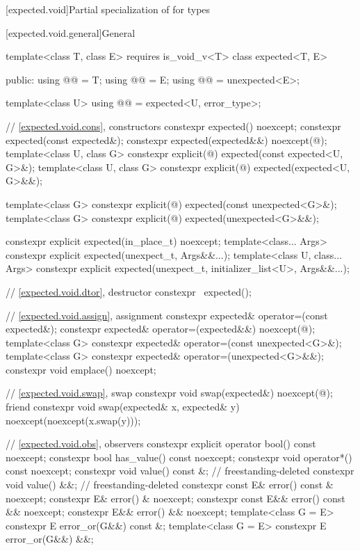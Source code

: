 [expected.void]{Partial specialization of  for  types}

[expected.void.general]{General}

\begin{codeblock}
template<class T, class E> requires is_void_v<T>
class expected<T, E> {
public:
  using @@ = T;
  using @@ = E;
  using @@ = unexpected<E>;

  template<class U>
  using @@ = expected<U, error_type>;

  // \ref{expected.void.cons}, constructors
  constexpr expected() noexcept;
  constexpr expected(const expected&);
  constexpr expected(expected&&) noexcept(@\seebelow@);
  template<class U, class G>
    constexpr explicit(@\seebelow@) expected(const expected<U, G>&);
  template<class U, class G>
    constexpr explicit(@\seebelow@) expected(expected<U, G>&&);

  template<class G>
    constexpr explicit(@\seebelow@) expected(const unexpected<G>&);
  template<class G>
    constexpr explicit(@\seebelow@) expected(unexpected<G>&&);

  constexpr explicit expected(in_place_t) noexcept;
  template<class... Args>
    constexpr explicit expected(unexpect_t, Args&&...);
  template<class U, class... Args>
    constexpr explicit expected(unexpect_t, initializer_list<U>, Args&&...);


  // \ref{expected.void.dtor}, destructor
  constexpr ~expected();

  // \ref{expected.void.assign}, assignment
  constexpr expected& operator=(const expected&);
  constexpr expected& operator=(expected&&) noexcept(@\seebelow@);
  template<class G>
    constexpr expected& operator=(const unexpected<G>&);
  template<class G>
    constexpr expected& operator=(unexpected<G>&&);
  constexpr void emplace() noexcept;

  // \ref{expected.void.swap}, swap
  constexpr void swap(expected&) noexcept(@\seebelow@);
  friend constexpr void swap(expected& x, expected& y) noexcept(noexcept(x.swap(y)));

  // \ref{expected.void.obs}, observers
  constexpr explicit operator bool() const noexcept;
  constexpr bool has_value() const noexcept;
  constexpr void operator*() const noexcept;
  constexpr void value() const &;                                           // freestanding-deleted
  constexpr void value() &&;                                                // freestanding-deleted
  constexpr const E& error() const & noexcept;
  constexpr E& error() & noexcept;
  constexpr const E&& error() const && noexcept;
  constexpr E&& error() && noexcept;
  template<class G = E> constexpr E error_or(G&&) const &;
  template<class G = E> constexpr E error_or(G&&) &&;

}
\end{codeblock}
